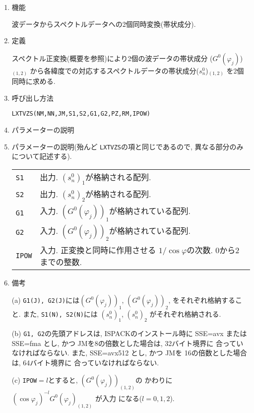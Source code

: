 \documentclass[a4j]{jarticle}
\begin{document}
\begin{enumerate}

\item 機能 

波データからスペクトルデータへの2個同時変換(帯状成分).

\item 定義

スペクトル正変換(概要を参照)により2個の波データの帯状成分
($G^0(\varphi_j)$)$_{(1,2)}$
から各緯度での対応するスペクトルデータの帯状成分($s^0_n$)$_{(1,2)}$
を2個同時に求める.

\item 呼び出し方法 

\texttt{LXTVZS(NM,NN,JM,S1,S2,G1,G2,PZ,RM,IPOW)}
  
\item パラメーターの説明

\item パラメーターの説明(殆んど \texttt{LXTVZS}の項と同じであるので,
異なる部分のみについて記述する).
  
\begin{tabular}{ll}
\texttt{S1} & 出力. $(s^0_n)_1$が格納される配列.\\
\texttt{S2} & 出力. $(s^0_n)_2$が格納される配列.\\
\texttt{G1} & 入力. $(G^0(\varphi_j))_1$が格納されている配列.\\
\texttt{G2} & 入力. $(G^0(\varphi_j))_2$が格納されている配列.\\
\texttt{IPOW} & 入力. 正変換と同時に作用させる
                      $1/\cos\varphi$の次数. 0から2までの整数.
\end{tabular}

\item 備考

  (a) \texttt{G1(J), G2(J)}には$(G^0(\varphi_j))_1$,
  $(G^0(\varphi_j))_2$, をそれぞれ格納すること.
  また, \texttt{S1(N), S2(N)}には
  $(s^0_n)_1$, $(s^0_n)_2$
  がそれぞれ格納される.

(b) \texttt{G1, G2}の先頭アドレスは, 
ISPACKのインストール時に SSE=avx または SSE=fma とし, かつ
JMを8の倍数とした場合は, 32バイト境界に
合っていなければならない.
また, SSE=avx512 とし, かつ
JMを 16の倍数とした場合は, 64バイト境界に
合っていなければならない.

(c) \texttt{IPOW}$=l$とすると, $(G^0(\varphi_j))_{(1,2)}$の
    かわりに $(\cos\varphi_j)^{-l}G^0(\varphi_j)_{(1,2)}$ が入力
    になる($l=0,1,2$).

\end{enumerate}
\end{document}
